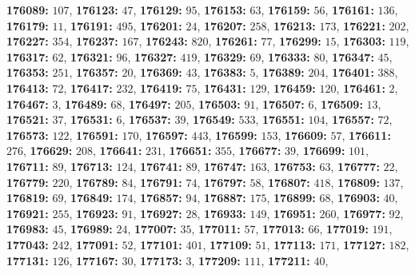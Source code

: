 \textsf{\bfseries 176089:} $107$, \textsf{\bfseries 176123:} $47$, \textsf{\bfseries 176129:} $95$, \textsf{\bfseries 176153:} $63$, \textsf{\bfseries 176159:} $56$, \textsf{\bfseries 176161:} $136$, \textsf{\bfseries 176179:} $11$, \textsf{\bfseries 176191:} $495$, \textsf{\bfseries 176201:} $24$, \textsf{\bfseries 176207:} $258$, \textsf{\bfseries 176213:} $173$, \textsf{\bfseries 176221:} $202$, \textsf{\bfseries 176227:} $354$, \textsf{\bfseries 176237:} $167$, \textsf{\bfseries 176243:} $820$, \textsf{\bfseries 176261:} $77$, \textsf{\bfseries 176299:} $15$, \textsf{\bfseries 176303:} $119$, \textsf{\bfseries 176317:} $62$, \textsf{\bfseries 176321:} $96$, \textsf{\bfseries 176327:} $419$, \textsf{\bfseries 176329:} $69$, \textsf{\bfseries 176333:} $80$, \textsf{\bfseries 176347:} $45$, \textsf{\bfseries 176353:} $251$, \textsf{\bfseries 176357:} $20$, \textsf{\bfseries 176369:} $43$, \textsf{\bfseries 176383:} $5$, \textsf{\bfseries 176389:} $204$, \textsf{\bfseries 176401:} $388$, \textsf{\bfseries 176413:} $72$, \textsf{\bfseries 176417:} $232$, \textsf{\bfseries 176419:} $75$, \textsf{\bfseries 176431:} $129$, \textsf{\bfseries 176459:} $120$, \textsf{\bfseries 176461:} $2$, \textsf{\bfseries 176467:} $3$, \textsf{\bfseries 176489:} $68$, \textsf{\bfseries 176497:} $205$, \textsf{\bfseries 176503:} $91$, \textsf{\bfseries 176507:} $6$, \textsf{\bfseries 176509:} $13$, \textsf{\bfseries 176521:} $37$, \textsf{\bfseries 176531:} $6$, \textsf{\bfseries 176537:} $39$, \textsf{\bfseries 176549:} $533$, \textsf{\bfseries 176551:} $104$, \textsf{\bfseries 176557:} $72$, \textsf{\bfseries 176573:} $122$, \textsf{\bfseries 176591:} $170$, \textsf{\bfseries 176597:} $443$, \textsf{\bfseries 176599:} $153$, \textsf{\bfseries 176609:} $57$, \textsf{\bfseries 176611:} $276$, \textsf{\bfseries 176629:} $208$, \textsf{\bfseries 176641:} $231$, \textsf{\bfseries 176651:} $355$, \textsf{\bfseries 176677:} $39$, \textsf{\bfseries 176699:} $101$, \textsf{\bfseries 176711:} $89$, \textsf{\bfseries 176713:} $124$, \textsf{\bfseries 176741:} $89$, \textsf{\bfseries 176747:} $163$, \textsf{\bfseries 176753:} $63$, \textsf{\bfseries 176777:} $22$, \textsf{\bfseries 176779:} $220$, \textsf{\bfseries 176789:} $84$, \textsf{\bfseries 176791:} $74$, \textsf{\bfseries 176797:} $58$, \textsf{\bfseries 176807:} $418$, \textsf{\bfseries 176809:} $137$, \textsf{\bfseries 176819:} $69$, \textsf{\bfseries 176849:} $174$, \textsf{\bfseries 176857:} $94$, \textsf{\bfseries 176887:} $175$, \textsf{\bfseries 176899:} $68$, \textsf{\bfseries 176903:} $40$, \textsf{\bfseries 176921:} $255$, \textsf{\bfseries 176923:} $91$, \textsf{\bfseries 176927:} $28$, \textsf{\bfseries 176933:} $149$, \textsf{\bfseries 176951:} $260$, \textsf{\bfseries 176977:} $92$, \textsf{\bfseries 176983:} $45$, \textsf{\bfseries 176989:} $24$, \textsf{\bfseries 177007:} $35$, \textsf{\bfseries 177011:} $57$, \textsf{\bfseries 177013:} $66$, \textsf{\bfseries 177019:} $191$, \textsf{\bfseries 177043:} $242$, \textsf{\bfseries 177091:} $52$, \textsf{\bfseries 177101:} $401$, \textsf{\bfseries 177109:} $51$, \textsf{\bfseries 177113:} $171$, \textsf{\bfseries 177127:} $182$, \textsf{\bfseries 177131:} $126$, \textsf{\bfseries 177167:} $30$, \textsf{\bfseries 177173:} $3$, \textsf{\bfseries 177209:} $111$, \textsf{\bfseries 177211:} $40$, 
